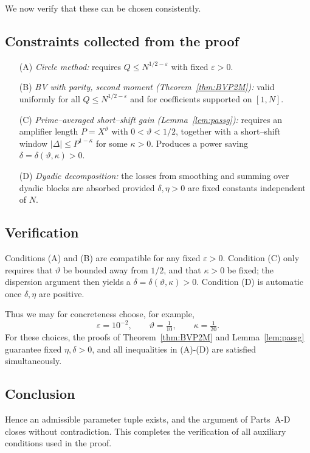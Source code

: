 \documentclass[11pt]{article}
\theoremstyle{definition}
\theoremstyle{remark}
\numberwithin{equation}{part}
\begin{document}
We now verify that these can be chosen consistently.

\subsection*{Constraints collected from the proof}
\begin{enumerate}
	\item[(A)] \emph{Circle method:} requires $Q\le N^{1/2-\varepsilon}$ with fixed $\varepsilon>0$.
	\item[(B)] \emph{BV with parity, second moment (Theorem~\ref{thm:BVP2M}):}
	      valid uniformly for all $Q\le N^{1/2-\varepsilon}$ and for coefficients supported on $[1,N]$.
	\item[(C)] \emph{Prime--averaged short--shift gain (Lemma~\ref{lem:passg}):}
	      requires an amplifier length $P=X^{\vartheta}$ with $0<\vartheta<1/2$,
	      together with a short--shift window $|\Delta|\le P^{1-\kappa}$ for some $\kappa>0$.
	      Produces a power saving $\delta=\delta(\vartheta,\kappa)>0$.
	\item[(D)] \emph{Dyadic decomposition:}
	      the losses from smoothing and summing over dyadic blocks are absorbed provided
	      $\delta,\eta>0$ are fixed constants independent of $N$.
\end{enumerate}

\subsection*{Verification}
Conditions (A) and (B) are compatible for any fixed $\varepsilon>0$.
Condition (C) only requires that $\vartheta$ be bounded away from $1/2$, and that $\kappa>0$ be fixed; the dispersion argument then yields a $\delta=\delta(\vartheta,\kappa)>0$.
Condition (D) is automatic once $\delta,\eta$ are positive.

Thus we may for concreteness choose, for example,
\[
	\varepsilon = 10^{-2},\qquad
	\vartheta = \tfrac{1}{10},\qquad
	\kappa = \tfrac{1}{20}.
\]
For these choices, the proofs of Theorem~\ref{thm:BVP2M} and Lemma~\ref{lem:passg} guarantee fixed $\eta,\delta>0$, and all inequalities in (A)-(D) are satisfied simultaneously.

\subsection*{Conclusion}
Hence an admissible parameter tuple exists, and the argument of Parts~A-D closes without contradiction.
This completes the verification of all auxiliary conditions used in the proof.



\end{document}
